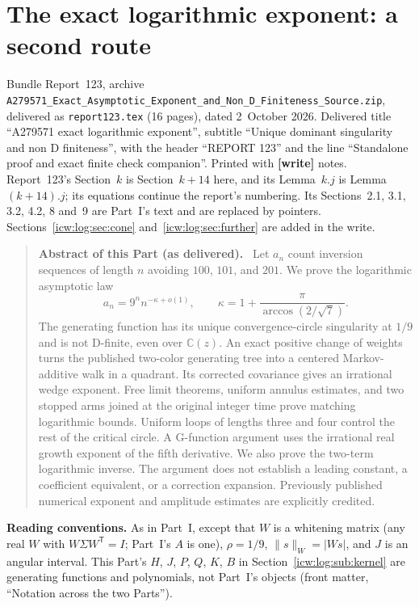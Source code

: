 \documentclass[11pt,letterpaper]{article}
\theoremstyle{remark}\newtheorem{remark}[theorem]{Remark}
\newcommand{\CC}{\mathbb C}
\newcommand{\1}{\mathbf1}
\newenvironment{partabstract}{\begin{quote}\small\noindent\textbf{Abstract of this Part (as delivered).}\ }{\end{quote}}
\newcommand{\partsource}[1]{\par\noindent\begin{minipage}{\textwidth}\small #1\end{minipage}\par\medskip}
\newcommand{\file}[1]{\textup{\nolinkurl{#1}}}
\begin{document}
\part{The exact logarithmic exponent: a second route}\label{icw:log:part}
\partsource{Bundle Report~123, archive \file{A279571_Exact_Asymptotic_Exponent_and_Non_D_Finiteness_Source.zip}, delivered as \file{report123.tex} (16 pages), dated 2~October 2026. Delivered title ``A279571 exact logarithmic exponent'', subtitle ``Unique dominant singularity and non D finiteness'', with the header ``REPORT 123'' and the line ``Standalone proof and exact finite check companion''. Printed with \textbf{[write]} notes. Report~123's Section~$k$ is Section~$k+14$ here, and its Lemma~$k.j$ is Lemma~$(k+14).j$; its equations continue the report's numbering. Its Sections~2.1, 3.1, 3.2, 4.2, 8 and~9 are Part~I's text and are replaced by pointers. Sections~\ref{icw:log:sec:cone} and~\ref{icw:log:sec:further} are added in the write.}
\begin{partabstract}
Let $a_n$ count inversion sequences of length $n$ avoiding $100$, $101$,
and $201$. We prove the logarithmic asymptotic law
\[
 a_n=9^n n^{-\kappa+o(1)},\qquad
 \kappa=1+\frac{\pi}{\arccos(2/\sqrt7)}.
\]
The generating function has its unique convergence-circle singularity at
$1/9$ and is not D-finite, even over $\CC(z)$. An exact positive change of
weights turns the published two-color generating tree into a centered
Markov-additive walk in a quadrant. Its corrected covariance gives an
irrational wedge exponent. Free limit theorems, uniform annulus estimates,
and two stopped arms joined at the original integer time prove matching
logarithmic bounds. Uniform loops of lengths three and four control the
rest of the critical circle. A G-function argument uses the irrational
real growth exponent of the fifth derivative. We also prove the two-term
logarithmic inverse. The argument does not establish a leading constant,
a coefficient equivalent, or a correction expansion. Previously published
numerical exponent and amplitude estimates are explicitly credited.
\end{partabstract}
\noindent\textbf{Reading conventions.} As in Part~I, except that $W$ is a whitening matrix (any real $W$ with $W\Sigma W^{\mathsf T}=I$; Part~I's $A$ is one), $\rho=1/9$, $\|s\|_W=|Ws|$, and $J$ is an angular interval. This Part's $H$, $J$, $P$, $Q$, $K$, $B$ in Section~\ref{icw:log:sub:kernel} are generating functions and polynomials, not Part~I's objects (front matter, ``Notation across the two Parts'').
\end{document}
